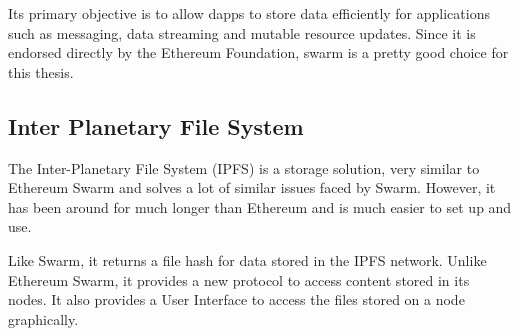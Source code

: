 \documentclass[11pt,openright]{report}
\begin{document}
Its primary objective is to allow dapps to store data efficiently for applications such as messaging, data streaming and mutable resource updates. Since it is endorsed directly by the Ethereum Foundation, swarm is a pretty good choice for this thesis.

\subsection{Inter Planetary File System}
The Inter-Planetary File System (IPFS) \cite{ipfs2014} is a storage solution, very similar to Ethereum Swarm and solves a lot of similar issues faced by Swarm. However, it has been around for much longer than Ethereum and is much easier to set up and use.

Like Swarm, it returns a file hash for data stored in the IPFS network. Unlike Ethereum Swarm, it provides a new protocol to access content stored in its nodes. It also provides a User Interface to access the files stored on a node graphically.
\end{document}
